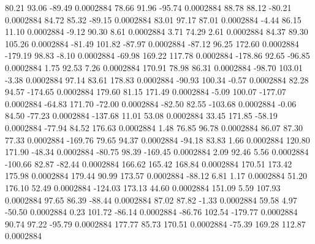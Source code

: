        80.21       93.06      -89.49     0.0002884
       78.66       91.96      -95.74     0.0002884
       88.78       88.12      -80.21     0.0002884
       84.72       85.32      -89.15     0.0002884
       83.01       97.17       87.01     0.0002884
       -4.44       86.15       11.10     0.0002884
       -9.12       90.30        8.61     0.0002884
        3.71       74.29        2.61     0.0002884
       84.37       89.30      105.26     0.0002884
      -81.49      101.82      -87.97     0.0002884
      -87.12       96.25      172.60     0.0002884
     -179.19       98.83       -8.10     0.0002884
      -69.98      169.22      117.78     0.0002884
     -178.86       92.65      -96.85     0.0002884
        1.75       92.53        7.26     0.0002884
      170.91       78.98       86.31     0.0002884
      -98.70      103.01       -3.38     0.0002884
       97.14       83.61      178.83     0.0002884
      -90.93      100.34       -0.57     0.0002884
       82.28       94.57     -174.65     0.0002884
      179.60       81.15      171.49     0.0002884
       -5.09      100.07     -177.07     0.0002884
      -64.83      171.70      -72.00     0.0002884
      -82.50       82.55     -103.68     0.0002884
       -0.06       84.50      -77.23     0.0002884
     -137.68       11.01       53.08     0.0002884
       33.45      171.85      -58.19     0.0002884
      -77.94       84.52      176.63     0.0002884
        1.48       76.85       96.78     0.0002884
       86.07       87.30       77.33     0.0002884
     -169.76       79.65       94.37     0.0002884
      -94.18       83.83        1.66     0.0002884
      120.80      171.90      -48.34     0.0002884
      -80.75       98.39     -169.45     0.0002884
        2.09       92.46        5.56     0.0002884
     -100.66       82.87      -82.44     0.0002884
      166.62      165.42      168.84     0.0002884
      170.51      173.42      175.98     0.0002884
      179.44       90.99      173.57     0.0002884
      -88.12        6.81        1.17     0.0002884
       51.20      176.10       52.49     0.0002884
     -124.03      173.13       44.60     0.0002884
      151.09        5.59      107.93     0.0002884
       97.65       86.39      -88.44     0.0002884
       87.02       87.82       -1.33     0.0002884
       59.58        4.97      -50.50     0.0002884
        0.23      101.72      -86.14     0.0002884
      -86.76      102.54     -179.77     0.0002884
       90.74       97.22      -95.79     0.0002884
      177.77       85.73      170.51     0.0002884
      -75.39      169.28      112.87     0.0002884
